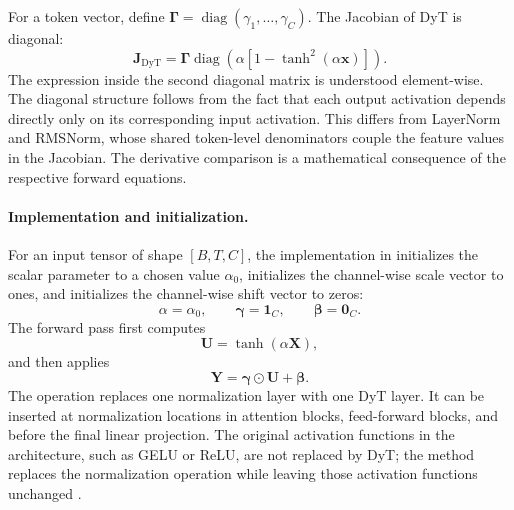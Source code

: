 For a token vector, define
\(\boldsymbol{\Gamma}
=\operatorname{diag}(\gamma_1,\ldots,\gamma_C)\).
The Jacobian of DyT is diagonal:
\begin{equation}
    \boxed{
    \mathbf{J}_{\mathrm{DyT}}
    =
    \boldsymbol{\Gamma}
    \operatorname{diag}
    \left(
        \alpha\left[
            1-\tanh^2(\alpha\mathbf{x})
        \right]
    \right).
    }
    \label{eq:norm-dyt-jacobian}
\end{equation}
The expression inside the second diagonal matrix is understood
element-wise. The diagonal structure follows from the fact that each
output activation depends directly only on its corresponding input
activation. This differs from LayerNorm and RMSNorm, whose shared
token-level denominators couple the feature values in the Jacobian.
The derivative comparison is a mathematical consequence of the
respective forward equations.

\paragraph{Implementation and initialization.}
For an input tensor of shape \([B,T,C]\), the implementation in
\textcite{zhu2025dyt} initializes the scalar parameter to a chosen value
\(\alpha_0\), initializes the channel-wise scale vector to ones, and
initializes the channel-wise shift vector to zeros:
\begin{equation}
    \alpha=\alpha_0,
    \qquad
    \boldsymbol{\gamma}=\mathbf{1}_C,
    \qquad
    \boldsymbol{\beta}=\mathbf{0}_C.
    \label{eq:norm-dyt-initialization}
\end{equation}
The forward pass first computes
\begin{equation}
    \mathbf{U}=\tanh(\alpha\mathbf{X}),
    \label{eq:norm-dyt-intermediate}
\end{equation}
and then applies
\begin{equation}
    \mathbf{Y}
    =
    \boldsymbol{\gamma}\odot\mathbf{U}
    +\boldsymbol{\beta}.
    \label{eq:norm-dyt-output}
\end{equation}
The operation replaces one normalization layer with one DyT layer. It
can be inserted at normalization locations in attention blocks,
feed-forward blocks, and before the final linear projection. The original
activation functions in the architecture, such as GELU or ReLU, are not
replaced by DyT; the method replaces the normalization operation while
leaving those activation functions unchanged
\parencite{zhu2025dyt}.

